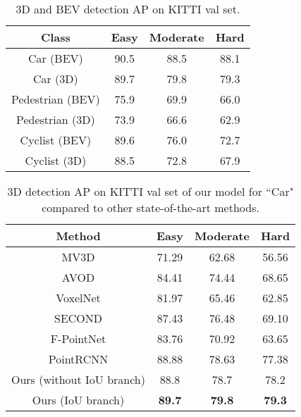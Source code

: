 \documentclass[10pt,twocolumn,letterpaper]{article}
\begin{document}
\begin{table}[t]
   \centering \addtolength{\tabcolsep}{-1pt}
   \footnotesize
   \begin{tabular}{|c|ccc|}
      \hline
      Class & Easy & Moderate & Hard \\
      \hline
      Car (BEV) & 90.5 & 88.5 & 88.1 \\
      Car (3D) & 89.7 & 79.8 & 79.3 \\
      \hline
      Pedestrian (BEV) & 75.9 & 69.9 & 66.0 \\
      Pedestrian (3D) & 73.9 & 66.6 & 62.9 \\
      \hline
      Cyclist (BEV) & 89.6 & 76.0 & 72.7 \\
      Cyclist (3D) & 88.5 & 72.8 & 67.9 \\
      \hline
   \end{tabular}\vspace{0.1cm}
   \caption{3D and BEV detection AP on KITTI val set.}
   \label{tab:kittival}
\end{table}

\begin{table}[t]
   \centering \addtolength{\tabcolsep}{-1pt}
   \footnotesize
   \begin{tabular}{|c|ccc|}
      \hline
      Method & Easy & Moderate & Hard \\
      \hline
      MV3D \cite{MV3D} & 71.29 & 62.68 & 56.56 \\
      AVOD \cite{AVOD} & 84.41 & 74.44 & 68.65 \\
      VoxelNet \cite{VOXELNET} & 81.97 & 65.46 & 62.85 \\ 
      SECOND \cite{yan2018second} & 87.43 & 76.48 & 69.10 \\
      F-PointNet \cite{FPOINTNET} & 83.76 & 70.92 & 63.65 \\
      PointRCNN \cite{shi2018pointrcnn} & 88.88 & 78.63 & 77.38 \\
      \hline
      Ours (without IoU branch) & 88.8 & 78.7 & 78.2 \\
      Ours (IoU branch) & \bf 89.7 & \bf 79.8 & \bf 79.3 \\
      \hline
   \end{tabular}\vspace{0.1cm}
   \caption{3D detection AP on KITTI val set of our model for ``Car" compared to other state-of-the-art methods.}\vspace{-0.05in}
   \label{tab:kittival_compare}
\end{table}
\end{document}
